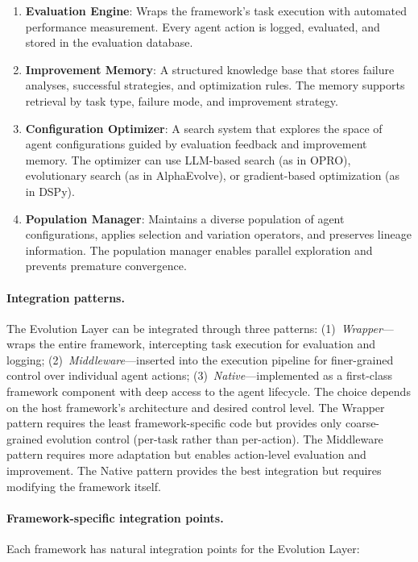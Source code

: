 \begin{enumerate}
    \item \textbf{Evaluation Engine}: Wraps the framework's task execution with automated performance measurement. Every agent action is logged, evaluated, and stored in the evaluation database.

    \item \textbf{Improvement Memory}: A structured knowledge base that stores failure analyses, successful strategies, and optimization rules. The memory supports retrieval by task type, failure mode, and improvement strategy.

    \item \textbf{Configuration Optimizer}: A search system that explores the space of agent configurations guided by evaluation feedback and improvement memory. The optimizer can use LLM-based search (as in OPRO), evolutionary search (as in AlphaEvolve), or gradient-based optimization (as in DSPy).

    \item \textbf{Population Manager}: Maintains a diverse population of agent configurations, applies selection and variation operators, and preserves lineage information. The population manager enables parallel exploration and prevents premature convergence.
\end{enumerate}

\paragraph{Integration patterns.}
The Evolution Layer can be integrated through three patterns: (1)~\emph{Wrapper}---wraps the entire framework, intercepting task execution for evaluation and logging; (2)~\emph{Middleware}---inserted into the execution pipeline for finer-grained control over individual agent actions; (3)~\emph{Native}---implemented as a first-class framework component with deep access to the agent lifecycle. The choice depends on the host framework's architecture and desired control level. The Wrapper pattern requires the least framework-specific code but provides only coarse-grained evolution control (per-task rather than per-action). The Middleware pattern requires more adaptation but enables action-level evaluation and improvement. The Native pattern provides the best integration but requires modifying the framework itself.

\paragraph{Framework-specific integration points.}
Each framework has natural integration points for the Evolution Layer:

